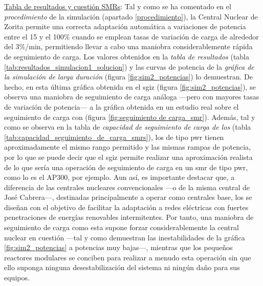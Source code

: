 \underline{Tabla de resultados y cuestión SMRs}: Tal y como se ha comentado en el \textit{procedimiento} de la simulación (apartado \ref{procedimiento}), la Central Nuclear de Zorita permite una correcta adaptación automática a variaciones de potencia entre el 15 y el 100\% cuando se emplean tasas de variación de carga de alrededor del 3\%/min, permitiendo llevar a cabo una maniobra considerablemente rápida de seguimiento de carga. Los valores obtenidos en la \textit{tabla de resultados} (tabla \ref{tab:resultados_simulacion1_solucion}) y las curvas de potencia de la \textit{gráfica de la simulación de larga duración} (figura \ref{fig:sim2_potencias}) lo demuestran. De hecho, en esta última gráfica obtenida en el \acrshort{sgiz} (figura \ref{fig:sim2_potencias}), se observa una maniobra de seguimiento de carga análoga ---pero con mayores tasas de variación de potencia--- a la gráfica obtenida en un estudio real sobre el seguimiento de carga con  (figura \ref{fig:seguimiento de carga_smr}). Además, tal y como se observa en la tabla de \textit{capacidad de seguimiento de carga de los } (tabla \ref{tab:capacidad_seguimiento_de_carga_smrs}), los  de tipo \acrshort{pwr} tienen aproximadamente el mismo rango permitido y las mismas rampas de potencia, por lo que se puede decir que el \acrshort{sgiz} permite realizar una aproximación realista de lo que sería una operación de seguimiento de carga en un \acrshort{smr} de tipo \acrshort{pwr}, como lo es el AP300, por ejemplo. Aun así, es importante destacar que, a diferencia de las centrales nucleares convencionales ---o de la misma central de José Cabrera---, destinadas principalmente a operar como centrales base, los  se diseñan con el objetivo de facilitar la adaptación a redes eléctricas con fuertes penetraciones de energías renovables intermitentes. Por tanto, una maniobra de seguimiento de carga como esta supone forzar considerablemente la central nuclear en cuestión ---tal y como demuestran las inestabilidades de la gráfica \ref{fig:sim2_potencias} a potencias muy bajas---, mientras que los pequeños reactores modulares se conciben para realizar a menudo esta operación sin que ello suponga ninguna desestabilización del sistema ni ningún daño para sus equipos.

